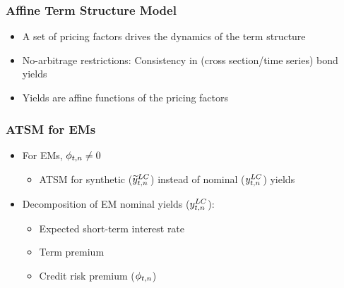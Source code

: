 \documentclass[12pt, aspectratio=169, xcolor=dvipsnames]{beamer}  %
\begin{document}
\begin{frame}
	\frametitle{Affine Term Structure Model}
	\begin{itemize}
		\item A set of pricing factors drives the dynamics of the term structure
		
		\item No-arbitrage restrictions: Consistency in (cross section/time series) bond yields
		\begin{center}
			 \qquad 
		\end{center}
		\item Yields are affine functions of the pricing factors
		
	\end{itemize}
\end{frame}

\begin{frame}
	\frametitle{ATSM for EMs}
	\begin{itemize}
		\item For EMs, $\phi_{t,n} \neq 0$ \citep{DuSchreger:2016JoF}
		\begin{itemize}
			\item ATSM for synthetic ($\widetilde{y}_{t,n} ^{LC}$) instead of nominal ($y_{t,n} ^{LC}$) yields
		\end{itemize}
		\item Decomposition of EM nominal yields ($y_{t,n} ^{LC}$):
		\begin{itemize}
			\item Expected short-term interest rate
			\item Term premium
			\item Credit risk premium ($\phi_{t,n}$)
		\end{itemize}
	\end{itemize}
\end{frame}
\end{document}
